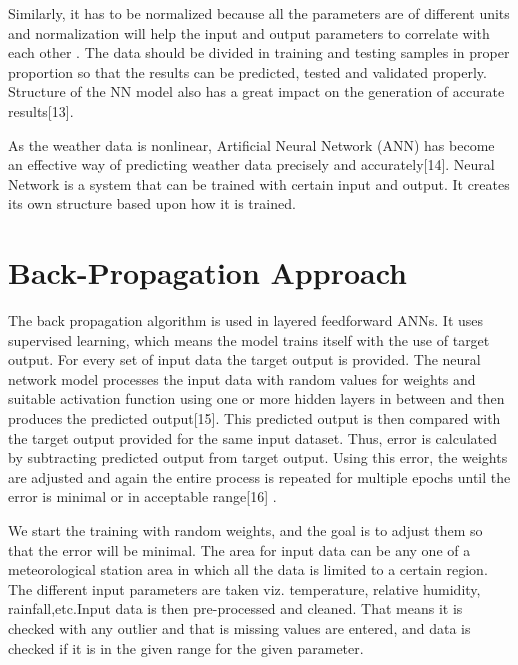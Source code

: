 Similarly, it has to be normalized because all the parameters are of different units and normalization will help the input and output parameters to correlate with each other . The data should be divided in training and testing samples in proper proportion so that the results can be predicted, tested and validated properly. Structure of the NN model also has a great impact on the generation of accurate results[13].

As the weather data is nonlinear, Artificial Neural Network (ANN) has become an effective way of predicting weather data precisely and accurately[14]. Neural Network is a system that can be trained with certain input and output. It creates its own structure based upon how it is trained.

\pagebreak
\section{Back-Propagation Approach}
The back propagation algorithm is used in layered feedforward ANNs. It uses supervised learning, which means the model trains itself with the use of target output. For every set of input data the target output is provided. The neural network model processes the input data with random values for weights and suitable activation function using one or more hidden layers in between and then produces the predicted output[15]. This predicted output is then compared with the target output provided for the same input dataset. Thus, error is calculated by subtracting predicted output from target output. Using this error, the weights are adjusted and again the entire process is repeated for multiple epochs until the error is minimal or in acceptable range[16] . 


We start the training with random weights, and the goal is to adjust them so that the error will be minimal. The area for input data can be any one of a meteorological station area in which all the data is limited to a certain region. The different input parameters are taken viz. temperature, relative humidity, rainfall,etc.Input data is then pre-processed and cleaned. That means it is checked with any outlier and that is missing values are entered, and data is checked if it is in the given range for the given parameter.



